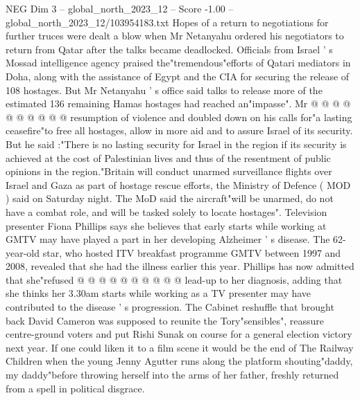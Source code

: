 \begin{textsample}{NEG Dim 3 – global\_north\_2023\_12 – Score -1.00 – global\_north\_2023\_12/103954183.txt}
Hopes of a return to negotiations for further truces were dealt a blow when Mr Netanyahu ordered his negotiators to return from Qatar after the talks became deadlocked.
Officials from Israel ' s Mossad intelligence agency praised the"tremendous"efforts of Qatari mediators in Doha, along with the assistance of Egypt and the CIA for securing the release of 108 hostages.
But Mr Netanyahu ' s office said talks to release more of the estimated 136 remaining Hamas hostages had reached an"impasse".
Mr @ @ @ @ @ @ @ @ @ @ resumption of violence and doubled down on his calls for"a lasting ceasefire"to free all hostages, allow in more aid and to assure Israel of its security.
But he said :"There is no lasting security for Israel in the region if its security is achieved at the cost of Palestinian lives and thus of the resentment of public opinions in the region."Britain will conduct unarmed surveillance flights over Israel and Gaza as part of hostage rescue efforts, the Ministry of Defence ( MOD ) said on Saturday night.
The MoD said the aircraft"will be unarmed, do not have a combat role, and will be tasked solely to locate hostages".
Television presenter Fiona Phillips says she believes that early starts while working at GMTV may have played a part in her developing Alzheimer ' s disease.
The 62-year-old star, who hosted ITV breakfast programme GMTV between 1997 and 2008, revealed that she had the illness earlier this year.
Phillips has now admitted that she"refused @ @ @ @ @ @ @ @ @ @ lead-up to her diagnosis, adding that she thinks her 3.30am starts while working as a TV presenter may have contributed to the disease ' s progression.
The Cabinet reshuffle that brought back David Cameron was supposed to reunite the Tory"sensibles", reassure centre-ground voters and put Rishi Sunak on course for a general election victory next year.
If one could liken it to a film scene it would be the end of The Railway Children when the young Jenny Agutter runs along the platform shouting"daddy, my daddy"before throwing herself into the arms of her father, freshly returned from a spell in political disgrace.

\end{textsample}
